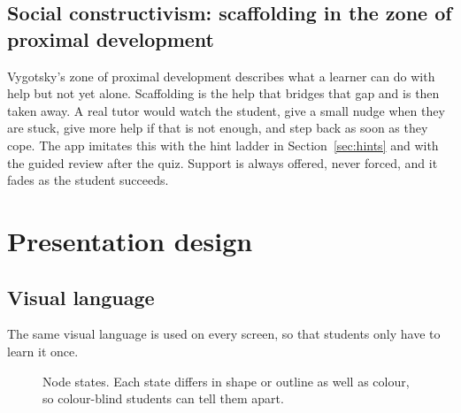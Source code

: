 \documentclass[11pt,a4paper]{article}
\begin{document}
\subsection{Social constructivism: scaffolding in the zone of proximal development}

Vygotsky's zone of proximal development \cite{vygotsky1978} describes what a learner can do with
help but not yet alone. Scaffolding \cite{wood1976} is the help that bridges that gap and is then
taken away. A real tutor would watch the student, give a small nudge when they are stuck, give
more help if that is not enough, and step back as soon as they cope. The app imitates this with
the hint ladder in Section~\ref{sec:hints} and with the guided review after the quiz. Support is
always offered, never forced, and it fades as the student succeeds.

\section{Presentation design}
\label{sec:presentation}

\subsection{Visual language}

The same visual language is used on every screen, so that students only have to learn it once.

\begin{figure}[H]
\centering
{}
\caption{Node states. Each state differs in shape or outline as well as colour, so colour-blind students can tell them apart.}
\label{fig:legend}
\end{figure}
\end{document}
